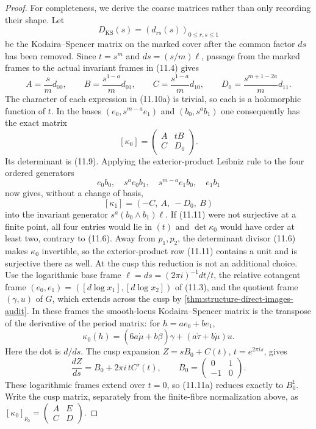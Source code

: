 \begin{proof}
For completeness, we derive the coarse matrices rather than only recording
their shape.  Let
\[
 D_{\mathrm{KS}}(s)=(d_{rs}(s))_{0\leq r,s\leq1}
\]
be the Kodaira--Spencer matrix on the marked cover after the common factor
$ds$ has been removed.  Since $t=s^m$ and
$ds=(s/m)\ell$, passage from the marked frames to the actual invariant
frames in (11.4) gives
\[
 A=\frac{s}{m}d_{00},\qquad
 B=\frac{s^{1-a}}m d_{01},\qquad
 C=\frac{s^{1-a}}m d_{10},\qquad
 D_0=\frac{s^{m+1-2a}}m d_{11}.
\tag{11.10a}
\]
The character of each expression in (11.10a) is trivial, so each is a
holomorphic function of $t$.  In the bases
$(e_0,s^{m-a}e_1)$ and $(b_0,s^ab_1)$ one consequently has the exact matrix
\[
 [\kappa_0]=\begin{pmatrix}A&tB\\ C&D_0\end{pmatrix}.
\tag{11.10b}
\]
Its determinant is (11.9).  Applying the exterior-product Leibniz rule to
the four ordered generators
\[
 e_0b_0,\quad s^ae_0b_1,\quad
 s^{m-a}e_1b_0,\quad e_1b_1
\]
now gives, without a change of basis,
\[
 [\kappa_1]=(-C,\ A,\ -D_0,\ B)
\tag{11.11}
\]
into the invariant generator $s^a(b_0\wedge b_1)\ell$.  If (11.11) were
not surjective at a finite point, all four entries would lie in $(t)$ and
$\det\kappa_0$ would have order at least two, contrary to (11.6).  Away
from $p_1,p_2$, the determinant divisor (11.6) makes $\kappa_0$
invertible, so the exterior-product row (11.11) contains a unit and is
surjective there as well.  At the cusp this reduction is not an additional
choice.  Use the logarithmic base
frame
\(\ell=ds=(2\pi i)^{-1}dt/t\), the relative cotangent frame
\((e_0,e_1)=([d\log x_1],[d\log x_2])\) of (11.3), and the quotient frame
\((\gamma,u)\) of \(G\), which extends across the cusp by
\cref{thm:structure-direct-images-audit}.  In these frames the smooth-locus Kodaira--Spencer matrix is the
transpose of the derivative of the period matrix: for
\(h=a e_0+b e_1\),
\[
 \kappa_0(h)=
 (6a\dot\mu+b\dot\beta)\gamma+
 (a\dot\tau+b\dot\mu)u .
 \tag{11.11a}
\]
Here the dot is \(d/ds\).  The cusp expansion
\(Z=sB_0+C(t)\), \(t=e^{2\pi i s}\), gives
\[
 \frac{dZ}{ds}=B_0+2\pi i\,tC'(t),
 \qquad
 B_0=\begin{pmatrix}0&1\\-1&0\end{pmatrix}.
\]
These logarithmic frames extend over \(t=0\), so (11.11a) reduces exactly
to \(B_0^{\mathsf t}\).  Write the cusp matrix, separately from the
finite-fibre normalization above, as
\([\kappa_0]_{p_0}=\left(\begin{smallmatrix}A&E\\C&D\end{smallmatrix}\right)\).

\end{proof}
